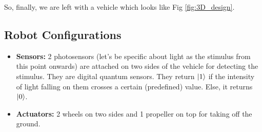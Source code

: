     \vspace{3mm}
    
    So, finally, we are left with a vehicle which looks like Fig \ref{fig:3D_design}.
    
    \subsection{Robot Configurations}
    \begin{itemize}
        \item \textbf{Sensors:} 2 photosensors (let's be specific about light as the stimulus from this point onwards) are attached on two sides of the vehicle for detecting the stimulus. They are digital quantum sensors. They return $\ket{1}$ if the intensity of light falling on them crosses a certain (predefined) value. Else, it returns $\ket{0}$.
        \item \textbf{Actuators:} 2 wheels on two sides and 1 propeller on top for taking off the ground.
    \end{itemize}
